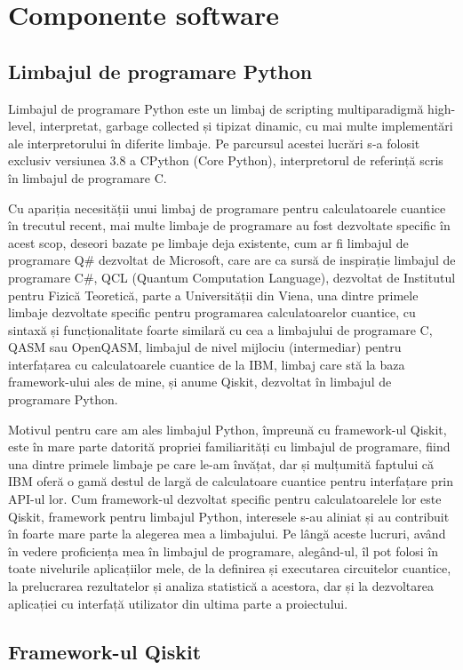 \section{Componente software}

\subsection{Limbajul de programare Python}

Limbajul de programare Python este un limbaj de scripting multiparadigmă high-level, interpretat, garbage collected și tipizat dinamic, cu mai multe implementări ale interpretorului în diferite limbaje. Pe parcursul acestei lucrări s-a folosit exclusiv versiunea 3.8 a CPython (Core Python), interpretorul de referință scris în limbajul de programare C. 

Cu apariția necesității unui limbaj de programare pentru calculatoarele cuantice în trecutul recent, mai multe limbaje de programare au fost dezvoltate specific în acest scop, deseori bazate pe limbaje deja existente, cum ar fi limbajul de programare Q\# dezvoltat de Microsoft, care are ca sursă de inspirație limbajul de programare C\#, QCL (Quantum Computation Language), dezvoltat de Institutul pentru Fizică Teoretică, parte a Universității din Viena, una dintre primele limbaje dezvoltate specific pentru programarea calculatoarelor cuantice, cu sintaxă și funcționalitate foarte similară cu cea a limbajului de programare C, QASM sau OpenQASM, limbajul de nivel mijlociu (intermediar) pentru interfațarea cu calculatoarele cuantice de la IBM, limbaj care stă la baza framework-ului ales de mine, și anume Qiskit, dezvoltat în limbajul de programare Python.

Motivul pentru care am ales limbajul Python, împreună cu framework-ul Qiskit, este în mare parte datorită propriei familiarități cu limbajul de programare, fiind una dintre primele limbaje pe care le-am învățat, dar și mulțumită faptului că IBM oferă o gamă destul de largă de calculatoare cuantice pentru interfațare prin API-ul lor. Cum framework-ul dezvoltat specific pentru calculatoarelele lor este Qiskit, framework pentru limbajul Python, interesele s-au aliniat și au contribuit în foarte mare parte la alegerea mea a limbajului. 
Pe lângă aceste lucruri, având în vedere proficiența mea în limbajul de programare, alegând-ul, îl pot folosi în toate nivelurile aplicațiilor mele, de la definirea și executarea circuitelor cuantice, la prelucrarea rezultatelor și analiza statistică a acestora, dar și la dezvoltarea aplicației cu interfață utilizator din ultima parte a proiectului. 

\subsection{Framework-ul Qiskit}


